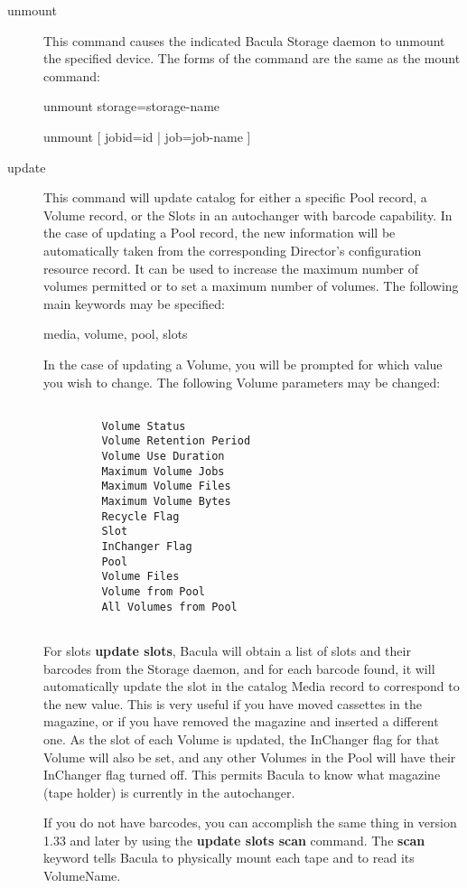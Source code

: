 \begin{description}
\item [unmount]
   This command causes the indicated Bacula Storage  daemon to unmount the
specified device. The forms of the command  are the same as the mount command:

unmount storage=\lt{}storage-name\gt{}

unmount [ jobid=\lt{}id\gt{} | job=\lt{}job-name\gt{} ]

\item [update]
   This command will update catalog for  either a specific Pool record, a Volume
record, or the Slots in an  autochanger with barcode capability. In the case
of updating a  Pool record, the new information will be automatically taken
from  the corresponding Director's configuration resource record. It  can be
used to increase the maximum number of volumes permitted or  to set a maximum
number of volumes. The following main  keywords may be specified:  

media, volume, pool, slots  

In the case of updating a  Volume, you will be prompted for which value you
wish to change.  The following Volume parameters may be changed:  

\footnotesize
\begin{verbatim}
 
         Volume Status
         Volume Retention Period
         Volume Use Duration
         Maximum Volume Jobs
         Maximum Volume Files
         Maximum Volume Bytes
         Recycle Flag
         Slot
         InChanger Flag
         Pool
         Volume Files
         Volume from Pool
         All Volumes from Pool
      
\end{verbatim}
\normalsize

For slots {\bf update slots}, Bacula will obtain a  list of slots and their
barcodes from the Storage daemon,  and for each barcode found, it will
automatically update the  slot in the catalog Media record to correspond to
the new value.  This is very useful if you have moved cassettes in the
magazine,  or if you have removed the magazine and inserted a different  one.
As the slot of each Volume is updated, the InChanger flag for  that Volume
will also be set, and any other Volumes in the Pool  will have their InChanger
flag turned off. This permits Bacula to  know what magazine (tape holder) is
currently in the autochanger.  

If you do not have barcodes, you can accomplish the same thing  in version
1.33 and later by using the {\bf update slots scan}  command. The {\bf scan}
keyword tells Bacula to physically mount  each tape and to read its
VolumeName.  


\end{description}
